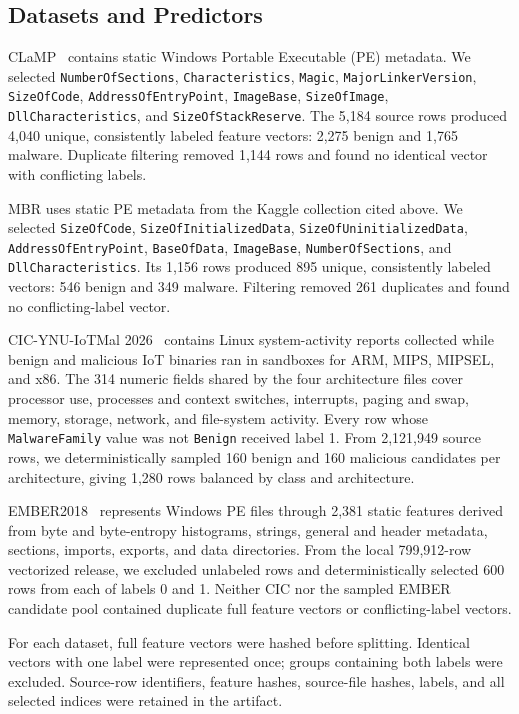 \subsection{Datasets and Predictors}

CLaMP~\cite{clamp} contains static Windows Portable Executable (PE) metadata. We selected \texttt{NumberOfSections}, \texttt{Characteristics}, \texttt{Magic}, \texttt{MajorLinkerVersion}, \texttt{SizeOfCode}, \texttt{AddressOfEntryPoint}, \texttt{ImageBase}, \texttt{SizeOfImage}, \texttt{DllCharacteristics}, and \texttt{SizeOfStackReserve}. The 5,184 source rows produced 4,040 unique, consistently labeled feature vectors: 2,275 benign and 1,765 malware. Duplicate filtering removed 1,144 rows and found no identical vector with conflicting labels.

MBR uses static PE metadata from the Kaggle collection cited above. We selected \texttt{SizeOfCode}, \texttt{SizeOfInitializedData}, \texttt{SizeOfUninitializedData}, \texttt{AddressOfEntryPoint}, \texttt{BaseOfData}, \texttt{ImageBase}, \texttt{NumberOfSections}, and \texttt{DllCharacteristics}. Its 1,156 rows produced 895 unique, consistently labeled vectors: 546 benign and 349 malware. Filtering removed 261 duplicates and found no conflicting-label vector.

CIC-YNU-IoTMal 2026~\cite{cic} contains Linux system-activity reports collected while benign and malicious IoT binaries ran in sandboxes for ARM, MIPS, MIPSEL, and x86. The 314 numeric fields shared by the four architecture files cover processor use, processes and context switches, interrupts, paging and swap, memory, storage, network, and file-system activity. Every row whose \texttt{MalwareFamily} value was not \texttt{Benign} received label 1. From 2,121,949 source rows, we deterministically sampled 160 benign and 160 malicious candidates per architecture, giving 1,280 rows balanced by class and architecture.

EMBER2018~\cite{ember2018} represents Windows PE files through 2,381 static features derived from byte and byte-entropy histograms, strings, general and header metadata, sections, imports, exports, and data directories. From the local 799,912-row vectorized release, we excluded unlabeled rows and deterministically selected 600 rows from each of labels 0 and 1. Neither CIC nor the sampled EMBER candidate pool contained duplicate full feature vectors or conflicting-label vectors.

For each dataset, full feature vectors were hashed before splitting. Identical vectors with one label were represented once; groups containing both labels were excluded. Source-row identifiers, feature hashes, source-file hashes, labels, and all selected indices were retained in the artifact.

